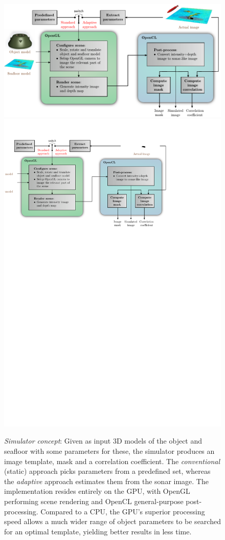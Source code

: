 \begin{figure}[t]\centering%
\ifOverLeaf%
  \includegraphics[width=\linewidth]{gfx/simulator.pdf}%
\else
  \includegraphics[drawing,width=\linewidth]{gfx/simulator.svg}%
\fi
\caption{\emph{Simulator concept}: Given as input 3D models of the object and seafloor with some parameters for these, the simulator produces an image template, mask and a correlation coefficient. The \emph{conventional} (static) approach picks parameters from a predefined set, whereas the \emph{adaptive} approach estimates them from the sonar image. The implementation resides entirely on the GPU, with OpenGL performing scene rendering and OpenCL general-purpose post-processing. Compared to a CPU, the GPU's superior processing speed allows a much wider range of object parameters to be searched for an optimal template, yielding better results in less time.}\label{IV_buildup}%
\end{figure}

